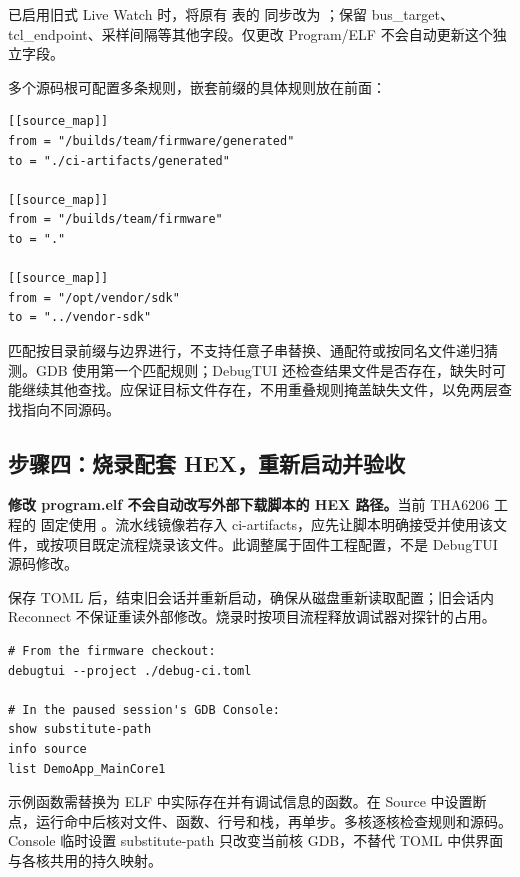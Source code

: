 \documentclass[UTF8,a4paper,11pt,oneside,fontset=none]{ctexart}
\newcommand{\code}[1]{\texttt{\detokenize{#1}}}
\begin{document}
已启用旧式 Live Watch 时，将原有 \code{[live_watch]} 表的 \code{elf} 同步改为 ；保留 bus\_target、tcl\_endpoint、采样间隔等其他字段。仅更改 Program/ELF 不会自动更新这个独立字段。

多个源码根可配置多条规则，嵌套前缀的具体规则放在前面：
\par\noindent\begin{minipage}{\linewidth}
\begin{lstlisting}
[[source_map]]
from = "/builds/team/firmware/generated"
to = "./ci-artifacts/generated"

[[source_map]]
from = "/builds/team/firmware"
to = "."

[[source_map]]
from = "/opt/vendor/sdk"
to = "../vendor-sdk"
\end{lstlisting}
\end{minipage}\par
匹配按目录前缀与边界进行，不支持任意子串替换、通配符或按同名文件递归猜测。GDB 使用第一个匹配规则；DebugTUI 还检查结果文件是否存在，缺失时可能继续其他查找。应保证目标文件存在，不用重叠规则掩盖缺失文件，以免两层查找指向不同源码。

\subsection{步骤四：烧录配套 HEX，重新启动并验收}
\textbf{修改 program.elf 不会自动改写外部下载脚本的 HEX 路径。}当前 THA6206 工程的  固定使用 。流水线镜像若存入 ci-artifacts，应先让脚本明确接受并使用该文件，或按项目既定流程烧录该文件。此调整属于固件工程配置，不是 DebugTUI 源码修改。

保存 TOML 后，结束旧会话并重新启动，确保从磁盘重新读取配置；旧会话内 Reconnect 不保证重读外部修改。烧录时按项目流程释放调试器对探针的占用。
\par\noindent\begin{minipage}{\linewidth}
\begin{lstlisting}
# From the firmware checkout:
debugtui --project ./debug-ci.toml

# In the paused session's GDB Console:
show substitute-path
info source
list DemoApp_MainCore1
\end{lstlisting}
\end{minipage}\par
示例函数需替换为 ELF 中实际存在并有调试信息的函数。在 Source 中设置断点，运行命中后核对文件、函数、行号和栈，再单步。多核逐核检查规则和源码。Console 临时设置 substitute-path 只改变当前核 GDB，不替代 TOML 中供界面与各核共用的持久映射。
\end{document}

